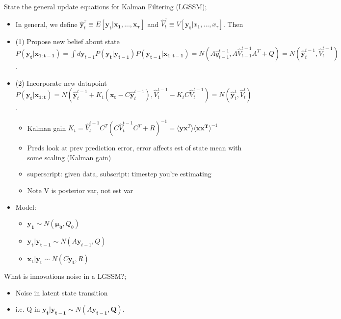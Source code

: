 \documentclass{article}
\begin{document}
State the general update equations for Kalman Filtering (LGSSM); \begin{itemize}
    \item In general, we define $\hat{\mathbf{y}}^\tau_t \equiv E[\mathbf{y_t|x_1,...,x_\tau}]$ and $\hat{V}^\tau_t \equiv V[\mathbf{y_t}|x_1,...,x_\tau]$. Then
        \item (1) Propose new belief about state $P(\mathbf{y_t|x_{1:t-1}})=\int d\mathbf{y}_{t-1}P(\mathbf{y_t|y_{t-1}})P(\mathbf{y_{t-1}|x_{1:t-1}})=N(A\hat{y}^{t-1}_{t-1}, A\hat{V}^{t-1}_{t-1}A^T+Q)=N(\hat{\mathbf{y}}^{t-1}_t, \hat{V}^{t-1}_t)$.
        \item (2) Incorporate new datapoint $P(\mathbf{y_t|x_{1:t}})=N(\hat{\mathbf{y}}^{t-1}_t+K_t(\mathbf{x_t}-C\mathbf{\hat{y}}^{t-1}_t), \hat{V}^{t-1}_t - K_tC\hat{V}^{t-1}_t)=N(\mathbf{\hat{y}}^t_t, \hat{V}^t_t)$.
        \begin{itemize}
            \item Kalman gain $K_t = \hat{V}^{t-1}_tC^T(C\hat{V}^{t-1}_tC^T+R)^{-1} = \langle \mathbf{yx}^T \rangle \langle \mathbf{xx^T} \rangle^{-1}$
            \item Preds look at prev prediction error, error affects est of state mean with some scaling (Kalman gain)
        \end{itemize}
        \begin{itemize}
        \item superscript: given data, subscript: timestep you're estimating
        \item Note V is posterior var, not est var
    \end{itemize}
        \item Model: \begin{itemize}
            \item $\mathbf{y_1}\sim N(\mathbf{\mu_0},Q_0)$
            \item $\mathbf{y_t|y_{t-1}}\sim N(A\mathbf{y}_{t-1}, Q)$
            \item $\mathbf{x_t|y_t}\sim N(C\mathbf{y_t},R)$
        \end{itemize}
\end{itemize}

What is innovations noise in a LGSSM?; \begin{itemize}
    \item Noise in latent state transition
    \item i.e. Q in $\mathbf{y_t|y_{t-1}}\sim N(A\mathbf{y_{t-1}, Q})$.
\end{itemize}

\end{document}
